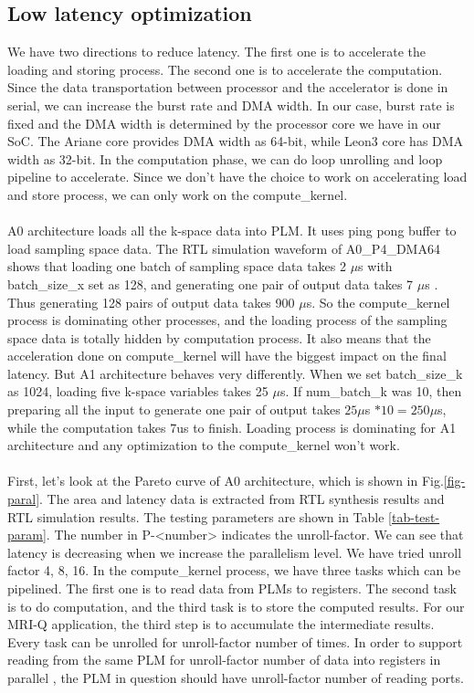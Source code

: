 \documentclass{sig-alternate}
\begin{document}
\subsection{Low latency optimization}
We have two directions to reduce latency. The first one is to accelerate the loading and storing process. The second one is to accelerate the computation. Since the data transportation between processor and the accelerator is done in serial, we can increase the burst rate and DMA width. In our case, burst rate is fixed and the DMA width is determined by the processor core we have in our SoC. The Ariane core provides DMA width as 64-bit, while Leon3 core has DMA width as 32-bit. In the computation phase, we can do loop unrolling and loop pipeline to accelerate. Since we don't have the choice to work on accelerating load and store process, we can only work on the compute\_kernel. \\
\\
A0 architecture loads all the k-space data into PLM. It uses ping pong buffer to load sampling space data. The RTL simulation waveform of A0\_P4\_DMA64 shows that loading one batch of sampling space data takes 2 $\mu$s with batch\_size\_x set as 128, and generating one pair of output data takes 7 $\mu$s . Thus generating 128 pairs of output data takes 900 $\mu$s. So the compute\_kernel process is dominating other processes, and the loading process of the sampling space data is totally hidden by computation process. It also means that the acceleration done on compute\_kernel will have the biggest impact on the final latency. But A1 architecture behaves very differently. When we set batch\_size\_k as 1024, loading five k-space variables takes 25 $\mu$s. If num\_batch\_k was 10, then preparing all the input to generate one pair of output takes $25\mu$s $* 10 = 250\mu$s, while the computation takes 7us to finish. Loading process is dominating for A1 architecture and any optimization to the compute\_kernel won't work. \\
\\
First, let's look at the Pareto curve of A0 architecture, which is shown in Fig.\ref{fig-paral}. The area and latency data is extracted from RTL synthesis results and RTL simulation results. The testing parameters are shown in Table \ref{tab-test-param}. The number in P-<number> indicates the unroll-factor. We can see that latency is decreasing when we increase the parallelism level. We have tried unroll factor 4, 8, 16. In the compute\_kernel process, we have three tasks which can be pipelined. The first one is to read data from PLMs to registers. The second task is to do computation, and the third task is to store the computed results. For our MRI-Q application, the third step is to accumulate the intermediate results. Every task can be unrolled for unroll-factor number of times. In order to support reading from the same PLM for unroll-factor number of data into registers in parallel , the PLM in question should have unroll-factor number of reading ports.
\end{document}
